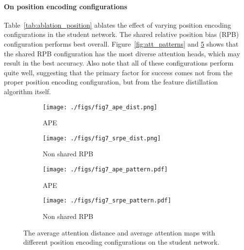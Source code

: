 \documentclass{article}
\begin{document}
\paragraph{On position encoding configurations} Table~\ref{tab:ablation_position} ablates the effect of varying position encoding configurations in the student network. The shared relative position bias (RPB) configuration performs best overall. Figure~\ref{fig:att_patterns} and \ref{fig:position_configuration} shows that the shared RPB configuration has the most diverse attention heads, which may result in the best accuracy. Also note that all of these configurations perform quite well, suggesting that the primary factor for success comes not from the proper position encoding configuration, but from the feature distillation algorithm itself.

\begin{figure}
\centering    
    \begin{minipage}{.18\textwidth}
          \centering
        \begin{subfigure}{1.0\textwidth}
          \centering
          \texttt{[image: ./figs/fig7\_ape\_dist.png]}
          \caption{APE}
          \label{fig:att_patterns_a}
        \end{subfigure}

        \begin{subfigure}{1.0\textwidth}
          \centering
          \texttt{[image: ./figs/fig7\_srpe\_dist.png]}
          \caption{Non shared RPB}
          \label{fig:att_patterns_b}
        \end{subfigure}
    \end{minipage}  
    \begin{minipage}{.80\textwidth}
          \centering
        \begin{subfigure}{.5\textwidth}
          \centering
          \texttt{[image: ./figs/fig7\_ape\_pattern.pdf]}
          \caption{APE}
          \label{fig:att_patterns_a}
        \end{subfigure}\begin{subfigure}{.5\textwidth}
          \centering
          \texttt{[image: ./figs/fig7\_srpe\_pattern.pdf]}
          \caption{Non shared RPB}
          \label{fig:att_patterns_b}
        \end{subfigure}
    \end{minipage}  
    \caption{The average attention distance and average attention maps with different position encoding configurations on the student network. }
    \label{fig:position_configuration}
\end{figure}
\end{document}
